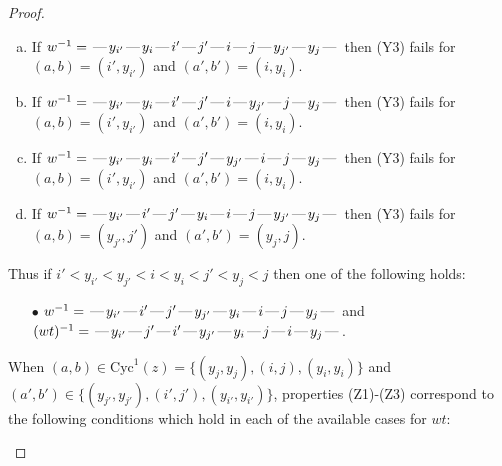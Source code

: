 \documentclass[10pt]{article}
\theoremstyle{definition}
\theoremstyle{definition}
\def\dash{\text{\hspace{0.5mm}---\hspace{0.5mm}}}
\def\Cyc{\mathrm{Cyc}}
\begin{document}
\begin{proof}
\begin{enumerate}
\begin{enumerate}[(a)]
\item If $w^{-1} = \dash y_{i'}\dash y_i\dash i'\dash j'\dash i\dash j\dash y_{j'}\dash y_j\dash $ then (Y3) fails for $(a,b)=(i',y_{i'})$ and $(a',b')=(i,y_i)$.
\item If $w^{-1} = \dash y_{i'}\dash y_i\dash i'\dash j'\dash i\dash y_{j'}\dash j\dash y_j\dash $ then (Y3) fails for $(a,b)=(i',y_{i'})$ and $(a',b')=(i,y_i)$.
\item If $w^{-1} = \dash y_{i'}\dash y_i\dash i'\dash j'\dash y_{j'}\dash i\dash j\dash y_j\dash $ then (Y3) fails for $(a,b)=(i',y_{i'})$ and $(a',b')=(i,y_i)$.
\item If $w^{-1} = \dash y_{i'}\dash i'\dash j'\dash y_i\dash i\dash j\dash y_{j'}\dash y_j\dash $ then (Y3) fails for $(a,b)=(y_{j'},j')$ and $(a',b')=(y_j,j)$.
\end{enumerate}
Thus if $i' < y_{i'} < y_{j'} < i < y_i < j' < y_j < j$ then one of the following holds:
\begin{enumerate}
\item[$\bullet$] $w^{-1} = \dash y_{i'}\dash i'\dash j'\dash y_{j'}\dash y_i\dash i\dash j\dash y_j\dash $ and $(wt)^{-1} = \dash y_{i'}\dash j'\dash i'\dash y_{j'}\dash y_i\dash j\dash i\dash y_j\dash $.
\end{enumerate}
When $(a,b)\in\Cyc^1(z)=\{(y_j,y_j),(i,j),(y_i,y_i)\}$ and $(a',b')\in\{(y_{j'},y_{j'}),(i',j'),(y_{i'},y_{i'})\}$,
properties (Z1)-(Z3) correspond to the following conditions which
hold in each of the available cases for $wt$:
\end{enumerate}
\end{proof}
\end{document}
